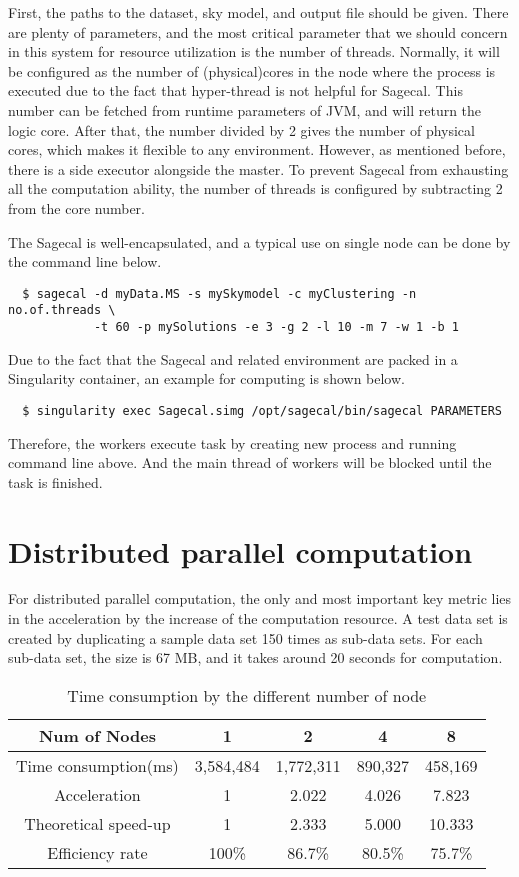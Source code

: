First, the paths to the dataset, sky model, and output file should be given.
There are plenty of parameters, and the most critical parameter that we should concern in this system for resource utilization is the number of threads.
Normally, it will be configured as the number of (physical)cores in the node where the process is executed due to the fact that hyper-thread is not helpful for Sagecal.
This number can be fetched from runtime parameters of JVM, and will return the logic core.
After that, the number divided by 2 gives the number of physical cores, which makes it flexible to any environment.
However, as mentioned before, there is a side executor alongside the master.
To prevent Sagecal from exhausting all the computation ability, the number of threads is configured by subtracting 2 from the  core number.

The Sagecal is well-encapsulated, and a typical use on single node can be done by  the command line below.

\begin{verbatim}
  $ sagecal -d myData.MS -s mySkymodel -c myClustering -n no.of.threads \
            -t 60 -p mySolutions -e 3 -g 2 -l 10 -m 7 -w 1 -b 1
\end{verbatim}
Due to the fact that the Sagecal and related environment are packed in a Singularity container, an example for computing is shown below.
\begin{verbatim}
  $ singularity exec Sagecal.simg /opt/sagecal/bin/sagecal PARAMETERS
\end{verbatim}
Therefore, the workers execute task by creating new process and running command line above. 
And the main thread of workers will be blocked until the task is finished.

\section{Distributed parallel computation}

For distributed parallel computation, the only and most important key metric lies in the acceleration by the increase of the computation resource.
A test data set is created by duplicating a sample data set 150 times as sub-data sets. 
For each sub-data set, the size is 67 MB, and it takes around 20 seconds for computation.


\begin{table}[]
    \centering
    \begin{tabular}{ccccc}
    \hline
    Num of Nodes      & 1         & 2         & 4       & 8       \\ \hline
    Time consumption(ms)  & 3,584,484 & 1,772,311 & 890,327 & 458,169 \\
    Acceleration      & 1         & 2.022     & 4.026   & 7.823   \\
    Theoretical speed-up & 1         & 2.333     & 5.000   & 10.333  \\
    Efficiency rate   & 100\%     & 86.7\%    & 80.5\%  & 75.7\% 
    \end{tabular}
    \caption{Time consumption by the different number of node}
    \label{tab:acc}
\end{table}

